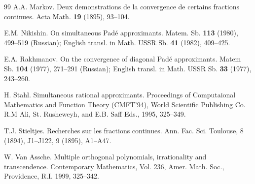 \documentclass[10pt,a4paper]{article}
\theoremstyle{definition}
\theoremstyle{remark}
\numberwithin{equation}{section}
\begin{document}
\begin{thebibliography}{99}
 A.A. Markov.   Deux demonstrations de la convergence de certains fractions continues. Acta Math. {\bf 19} (1895), 93--104.


 E.M. Nikishin. On simultaneous Pad\'e approximants. Matem. Sb. {\bf 113} (1980), 499--519 (Russian); English transl. in Math. USSR Sb.  {\bf 41} (1982), 409--425.

  E.A. Rakhmanov.
On the convergence of diagonal Pad\'e approximants. Matem Sb. {\bf 104} (1977), 271--291 (Russian); English transl. in Math. USSR Sb. {\bf 33} (1977), 243--260.

  H. Stahl. Simultaneous rational approximants. Proceedings of Computaional Mathematics and Function Theory (CMFT'94), World Scientific Publishing Co. R.M Ali, St. Rusheweyh, and E.B. Saff Eds., 1995, 325--349.

 T.J. Stieltjes.  Recherches sur les fractions continues. Ann. Fac. Sci. Toulouse, 8 (1894), J1--J122, 9 (1895), A1--A47.

  W. Van Assche.   Multiple orthogonal polynomials, irrationality and transcendence. Contemporary Mathematics, Vol. 236, Amer. Math. Soc., Providence, R.I. 1999, 325--342.



\end{thebibliography}
\end{document}
